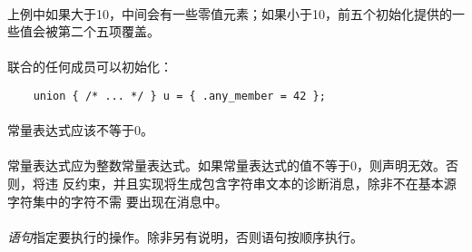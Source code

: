 \paragraph{}
上例中如果大于10，中间会有一些零值元素；如果小于10，前五个初始化提供的一
些值会被第二个五项覆盖。

\paragraph{}
\ex 联合的任何成员可以初始化：
\begin{lstlisting}
    union { /* ... */ } u = { .any_member = 42 };
\end{lstlisting}


\syntax
\paragraph{}

\constraint
\paragraph{}
常量表达式应该不等于0。

\semantic
\paragraph{}
常量表达式应为整数常量表达式。如果常量表达式的值不等于0，则声明无效。否则，将违
反约束，并且实现将生成包含字符串文本的诊断消息，除非不在基本源字符集中的字符不需
要出现在消息中。


\syntax
\paragraph{}

\semantic
\paragraph{}
\textit{语句}指定要执行的操作。除非另有说明，否则语句按顺序执行。

